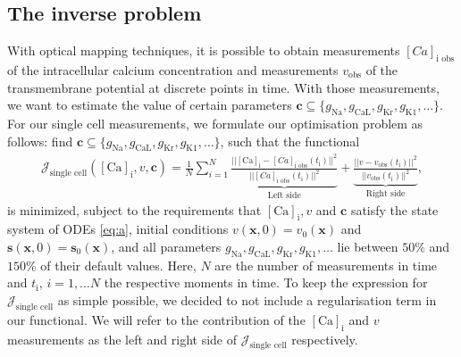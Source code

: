\documentclass{article}
\begin{document}
\subsection{The inverse problem} \label{The inverse problem}
With optical mapping techniques, it is possible to obtain measurements $[Ca]_{\text{i obs}}$ of the intracellular calcium concentration and measurements $v_{\text{obs}}$ of the transmembrane potential at discrete points in time. With those measurements, we want to estimate the value of certain parameters $\boldsymbol{c}\subseteq \{g_{\mathrm{Na}}, g_{\mathrm{CaL}}, g_{\mathrm{Kr}}, g_{\mathrm{K1}}, \ldots \}$. For our single cell measurements, we formulate our optimisation problem as follows: find $\boldsymbol{c} \subseteq\{ g_{\mathrm{Na}}, g_{\mathrm{CaL}}, g_{\mathrm{Kr}}, g_{\mathrm{K1}}, \ldots \}$, such that the functional
\begin{eqnarray}
\mathcal{J}_{\text{single cell}}([\mathrm{Ca}]_{\mathrm{i}},v, \boldsymbol{c}) = \frac{1}{N} \sum_{i=1}^{N} \underbrace{\frac{||[\mathrm{Ca}]_{\mathrm{i}}-[Ca]_{\text{i obs}}(t_{\mathrm{i}}) ||^2}{||[Ca]_{\text{i obs}}(t_{\mathrm{i}}) ||^2}}_{\text{Left side}} + \underbrace{\frac{||v-v_{\text{obs}}(t_{\mathrm{i}})||^2}{||v_{\text{obs}}(t_{\mathrm{i}})||^2}}_{\text{Right side}}, \label{J_s}
\end{eqnarray}
is minimized, subject to the requirements that $[\mathrm{Ca}]_{\mathrm{i}}, v$ and $\boldsymbol{c}$ satisfy the state system of ODEs \eqref{eq:a}, initial conditions $v(\textbf{x},0)=v_0(\textbf{x})$ and $\mathbf{s}(\mathbf{x},0)=\mathbf{s}_0(\mathbf{x})$, and all parameters $g_{\mathrm{Na}}, g_{\mathrm{CaL}}, g_{\mathrm{Kr}}, g_{\mathrm{K1}}, \ldots$ lie between $50\%$ and $150\%$ of their default values. Here, $N$ are the number of measurements in time and $t_{\mathrm{i}}$, $i=1, \dots N$ the respective moments in time. To keep the expression for $\mathcal{J}_{\text{single cell}}$ as simple possible, we decided to not include a regularisation term in our functional. We will refer to the contribution of the $[\mathrm{Ca}]_{\mathrm{i}}$ and $v$ measurements as the left and right side of $\mathcal{J}_{\text{single cell}}$ respectively.
\end{document}
